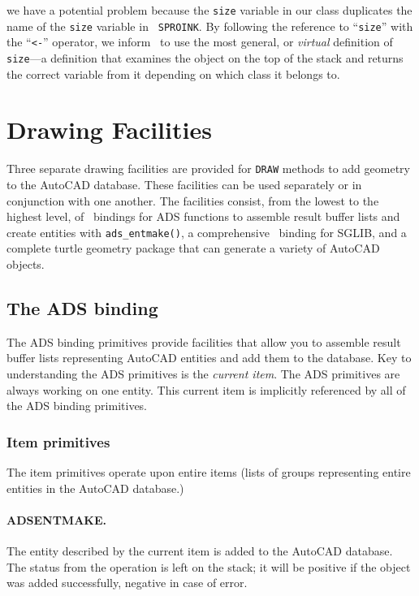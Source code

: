 \documentclass{article}
\begin{document}
we have a potential problem because the {\tt size} variable in our
class duplicates the name of the {\tt size} variable in {\tt
SPROINK}\@.  By following the reference to ``{\tt size}'' with the
``{\tt <-}'' operator, we inform \cw\ to use the most general, or {\em
virtual} definition of {\tt size}---a definition that examines the
object on the top of the stack and returns the correct variable from
it depending on which class it belongs to.

\section{Drawing Facilities}

Three separate drawing facilities are provided for {\tt DRAW} methods
to add geometry to the AutoCAD database.  These facilities can
be used separately or in conjunction with one another.  The facilities
consist, from the lowest to the highest level, of \atlas\ bindings for
ADS functions to assemble result buffer lists and create entities with
\verb+ads_entmake()+, a comprehensive \atlas\ binding for SGLIB, and a
complete turtle geometry package that can generate a variety of
AutoCAD objects.

\subsection{The ADS binding}

The ADS binding primitives provide facilities that allow you to
assemble result buffer lists representing AutoCAD entities and add
them to the database.  Key to understanding the ADS primitives is the
{\em current item}.  The ADS primitives are always working on one
entity.  This current item is implicitly referenced by all of the ADS
binding primitives.

\subsubsection{Item primitives}
The item primitives operate upon entire items (lists of groups
representing entire entities in the AutoCAD database.)

\paragraph{ADS\underline{\hspace{0.5em}}ENTMAKE.}  The entity
described by the current item is added to the AutoCAD database.  The
status from the operation is left on the stack; it will be positive if
the object was added successfully, negative in case of error.
\end{document}
